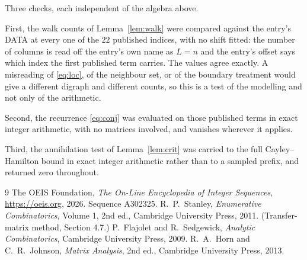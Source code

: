 \documentclass[11pt,a4paper]{article}
\theoremstyle{plain}
\theoremstyle{definition}
\begin{document}
Three checks, each independent of the algebra above.

First, the walk counts of Lemma~\ref{lem:walk} were compared against the entry's DATA at
every one of the $22$ published indices, with no shift fitted: the number of columns is
read off the entry's own name as $L=n$ and the entry's offset says which index the first
published term carries. The values agree exactly. A misreading of \eqref{eq:loc}, of the
neighbour set, or of the boundary treatment would give a different digraph and different
counts, so this is a test of the modelling and not only of the arithmetic.

Second, the recurrence \eqref{eq:conj} was evaluated on those published terms in exact
integer arithmetic, with no matrices involved, and vanishes wherever it applies.

Third, the annihilation test of Lemma~\ref{lem:crit} was carried to the full
Cayley--Hamilton bound in exact integer arithmetic rather than to a sampled prefix, and
returned zero throughout.

\begin{thebibliography}{9}
 The OEIS Foundation, \emph{The On-Line Encyclopedia of Integer
Sequences}, \url{https://oeis.org}, 2026. Sequence A302325.
 R.~P.~Stanley, \emph{Enumerative Combinatorics}, Volume 1, 2nd ed.,
Cambridge University Press, 2011. (Transfer-matrix method, Section 4.7.)
 P.~Flajolet and R.~Sedgewick, \emph{Analytic Combinatorics}, Cambridge
University Press, 2009.
 R.~A.~Horn and C.~R.~Johnson, \emph{Matrix Analysis}, 2nd ed., Cambridge
University Press, 2013.
\end{thebibliography}
\end{document}
